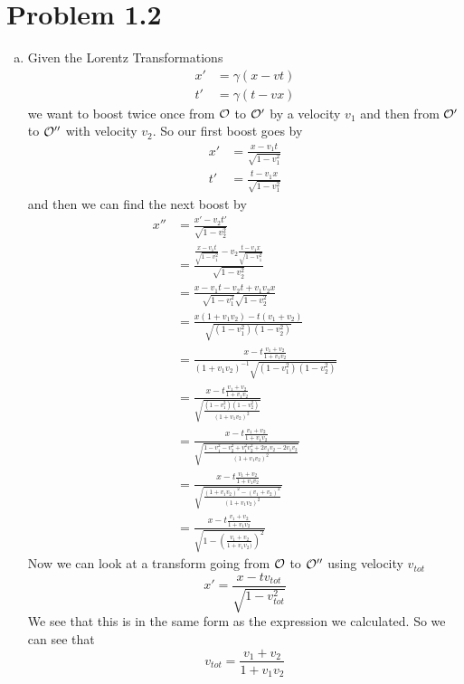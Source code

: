 \documentclass[11pt]{article}
\numberwithin{equation}{section}
\begin{document}
\section{Problem 1.2}
\begin{enumerate}[(a)]
\item
Given the Lorentz Transformations 
\begin{align}
\label{Lorn1}
x' &= \gamma(x - vt)\\
\label{Lorn2}
t' &= \gamma(t - vx)
\end{align}
we want to boost twice once from $\mathcal{O}$ to $\mathcal{O}'$ by a velocity $v_1$ and then from $\mathcal{O}'$ to $\mathcal{O}''$ with velocity $v_2$. So our first boost goes by 
\begin{align*}
x' &= \frac{x - v_1t}{\sqrt{1-v_1^2}}\\
t' &= \frac{t - v_1x}{\sqrt{1-v_1^2}}
\end{align*}
and then we can find the next boost by
\begin{align*}
x'' &= \frac{x' - v_2t'}{\sqrt{1-v_2^2}}\\
&= \frac{\frac{x - v_1t}{\sqrt{1-v_1^2}} - v_2\frac{t - v_1x}{\sqrt{1-v_1^2}}}{\sqrt{1-v_2^2}}\\
&= \frac{x - v_1t - v_2t + v_1v_2x}{\sqrt{1-v_1^2}\sqrt{1-v_2^2}}\\
&= \frac{x(1+v_1v_2) - t(v_1+v_2)}{\sqrt{(1-v_1^2)(1-v_2^2)}}\\
&= \frac{x - t\frac{v_1+v_2}{1+v_1v_2}}{(1+v_1v_2)^{-1}\sqrt{(1-v_1^2)(1-v_2^2)}}\\
&= \frac{x - t\frac{v_1+v_2}{1+v_1v_2}}{\sqrt{\frac{(1-v_1^2)(1-v_2^2)}{(1+v_1v_2)^2}}}\\
&= \frac{x - t\frac{v_1+v_2}{1+v_1v_2}}{\sqrt{\frac{1 - v_1^2 - v_2^2 +v_1^2v_2^2+2v_1v_2-2v_1v_2}{(1+v_1v_2)^2}}}\\
&= \frac{x - t\frac{v_1+v_2}{1+v_1v_2}}{\sqrt{\frac{(1 + v_1v_2)^2 - (v_1+v_2)^2}{(1+v_1v_2)^2}}}\\
&= \frac{x - t\frac{v_1+v_2}{1+v_1v_2}}{\sqrt{1-\left(\frac{v_1+v_2}{1+v_1v_2)}\right)^2}}
\end{align*}
Now we can look at a transform going from $\mathcal{O}$ to $\mathcal{O}''$ using velocity $v_{tot}$ 
$$x' = \frac{x - tv_{tot}}{\sqrt{1-v_{tot}^2}}$$
We see that this is in the same form as the expression we calculated. So we can see that
$$v_{tot} = \frac{v_1+v_2}{1+v_1v_2}$$


\end{enumerate}
\end{document}
